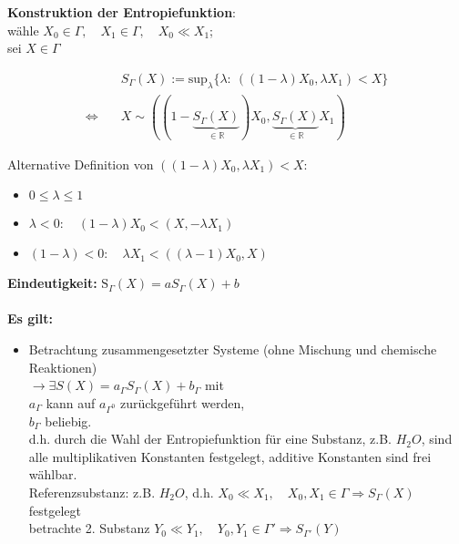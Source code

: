 \documentclass[10pt]{scrartcl}
\begin{document}
\textbf{Konstruktion der Entropiefunktion}:\\
wähle $X_0 \in \Gamma, \quad X_1 \in \Gamma, \quad X_0 \ll X_1$;\\
sei $X \in \Gamma$
\begin{fleqn}
\begin{equation}
\begin{aligned}
\quad &S_\Gamma(X) :=\text{sup}_\lambda \{\lambda: \ ((1-\lambda)X_0,\lambda X_1) < X\}\\
\Leftrightarrow \quad &X \sim ((1-\underbrace{S_\Gamma(X)}_{\in \mathbb{R}})X_0,\underbrace{S_\Gamma(X)}_{\in \mathbb{R}}X_1)
\end{aligned}
\end{equation}
\end{fleqn}
Alternative Definition von $((1-\lambda)X_0,\lambda X_1)<X$:\\
\begin{itemize}
\item $0 \leq \lambda \leq 1$
\item $\lambda < 0: \quad (1-\lambda)X_0<(X,-\lambda X_1)$
\item $(1-\lambda)<0: \quad \lambda X_1<((\lambda-1)X_0,X)$
\end{itemize} 
\textbf{Eindeutigkeit:} $\text{\~{S}}_\Gamma(X)=aS_\Gamma(X)+b$\\ \\
\textbf{Es gilt:}
\begin{itemize}
\item Betrachtung zusammengesetzter Systeme (ohne Mischung und chemische Reaktionen)\\
$\rightarrow \exists S(X) = a_\Gamma S_\Gamma(X) + b_\Gamma$ mit\\ 
$a_\Gamma$ kann auf $a_{\Gamma^0}$ zurückgeführt werden,\\ 
$b_\Gamma$ beliebig.\\
d.h. durch die Wahl der Entropiefunktion für eine Substanz, z.B. $H_2O$, sind alle multiplikativen Konstanten festgelegt, additive Konstanten sind frei wählbar.\\
Referenzsubstanz: z.B. $H_2O$, d.h. $X_0 \ll X_1, \quad X_0,X_1 \in \Gamma \Rightarrow S_\Gamma(X)$ festgelegt\\
betrachte 2. Substanz $Y_0 \ll Y_1, \quad Y_0,Y_1 \in \Gamma' \Rightarrow S_{\Gamma'}(Y)$
\end{itemize}
\end{document}
